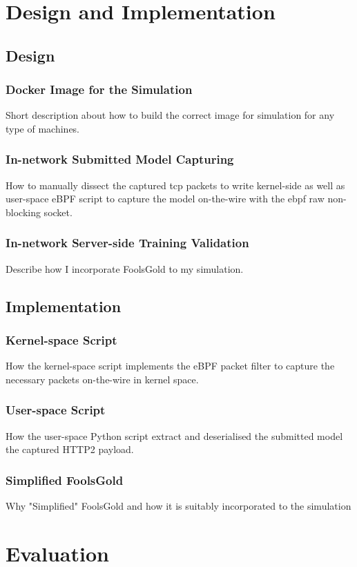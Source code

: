 \documentclass{article}
\begin{document}
\section{Design and Implementation}
\subsection{Design}
\subsubsection{Docker Image for the Simulation}
Short description about how to build the correct image for simulation for any
type of machines.
\subsubsection{In-network Submitted Model Capturing}
How to manually dissect the captured tcp packets to write kernel-side as well
as user-space eBPF script to capture the model on-the-wire with the ebpf raw
non-blocking socket.
\subsubsection{In-network Server-side Training Validation}
Describe how I incorporate FoolsGold to my simulation.

\subsection{Implementation}
\subsubsection{Kernel-space Script}
How the kernel-space script implements the eBPF packet filter to capture the
necessary packets on-the-wire in kernel space.
\subsubsection{User-space Script}
How the user-space Python script extract and deserialised the submitted model
the captured HTTP2 payload.
\subsubsection{Simplified FoolsGold}
Why "Simplified" FoolsGold and how it is suitably incorporated to the simulation

\section{Evaluation}
\end{document}
